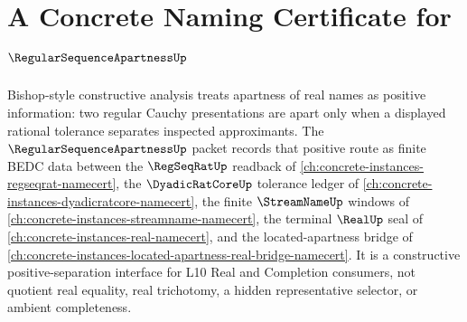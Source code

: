 \chapter{A Concrete Naming Certificate for $\RegularSequenceApartnessUp$}
\label{ch:concrete-instances-regular-sequence-apartness-namecert}

Bishop-style constructive analysis treats apartness of real names as positive information: two regular Cauchy presentations are apart only when a displayed rational tolerance separates inspected approximants. The $\RegularSequenceApartnessUp$ packet records that positive route as finite BEDC data between the $\RegSeqRatUp$ readback of \autoref{ch:concrete-instances-regseqrat-namecert}, the $\DyadicRatCoreUp$ tolerance ledger of \autoref{ch:concrete-instances-dyadicratcore-namecert}, the finite $\StreamNameUp$ windows of \autoref{ch:concrete-instances-streamname-namecert}, the terminal $\RealUp$ seal of \autoref{ch:concrete-instances-real-namecert}, and the located-apartness bridge of \autoref{ch:concrete-instances-located-apartness-real-bridge-namecert}. It is a constructive positive-separation interface for L10 Real and Completion consumers, not quotient real equality, real trichotomy, a hidden representative selector, or ambient completeness.

